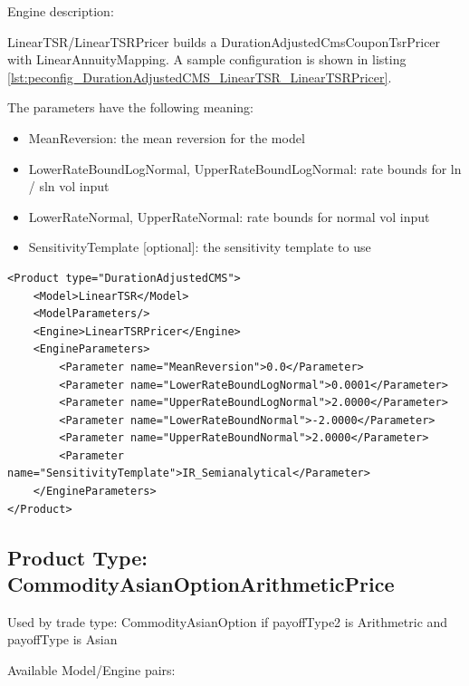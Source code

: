 Engine description:

LinearTSR/LinearTSRPricer builds a DurationAdjustedCmsCouponTsrPricer with LinearAnnuityMapping. A sample configuration
is shown in listing \ref{lst:peconfig_DurationAdjustedCMS_LinearTSR_LinearTSRPricer}.

The parameters have the following meaning:

\begin{itemize}
\item MeanReversion: the mean reversion for the model
\item LowerRateBoundLogNormal, UpperRateBoundLogNormal: rate bounds for ln / sln vol input
\item LowerRateNormal, UpperRateNormal: rate bounds for normal vol input
\item SensitivityTemplate [optional]: the sensitivity template to use
\end{itemize}

\begin{longlisting}
\begin{verbatim}
<Product type="DurationAdjustedCMS">
    <Model>LinearTSR</Model>
    <ModelParameters/>
    <Engine>LinearTSRPricer</Engine>
    <EngineParameters>
        <Parameter name="MeanReversion">0.0</Parameter>
        <Parameter name="LowerRateBoundLogNormal">0.0001</Parameter>
        <Parameter name="UpperRateBoundLogNormal">2.0000</Parameter>
        <Parameter name="LowerRateBoundNormal">-2.0000</Parameter>
        <Parameter name="UpperRateBoundNormal">2.0000</Parameter>
        <Parameter name="SensitivityTemplate">IR_Semianalytical</Parameter>
    </EngineParameters>
</Product>
\end{verbatim}
\caption{Configuration for Product DurationAdjustedCMS, Model LinearTSR, Engine LinearTSRPricer}
\label{lst:peconfig_DurationAdjustedCMS_LinearTSR_LinearTSRPricer}
\end{longlisting}

\subsection{Product Type: CommodityAsianOptionArithmeticPrice}

Used by trade type: CommodityAsianOption if payoffType2 is Arithmetric and payoffType is Asian

Available Model/Engine pairs:

